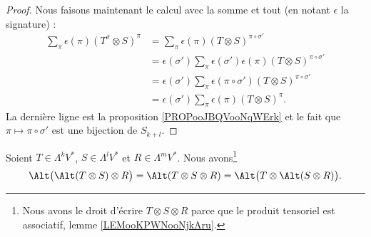 \begin{proof}
	Nous faisons maintenant le calcul avec la somme et tout (en notant \( \epsilon\) la signature) :
	\begin{subequations}
		\begin{align}
			\sum_{\pi}\epsilon(\pi)(T^{\sigma}\otimes S)^{\pi} & =\sum_{\pi}\epsilon(\pi)(T\otimes S)^{\pi\circ \sigma'}                                   \\
			                                                   & =\epsilon(\sigma')\sum_{\pi}\epsilon(\sigma')\epsilon(\pi) (T\otimes S)^{\pi\circ\sigma'} \\
			                                                   & =\epsilon(\sigma')\sum_{\pi}\epsilon(\pi\circ\sigma')(T\otimes S)^{\pi\circ \sigma'}      \\
			                                                   & =\epsilon(\sigma')\sum_{\pi}\epsilon(\pi)(T\otimes S)^{\pi}.
		\end{align}
	\end{subequations}
	La dernière ligne est la proposition \ref{PROPooJBQVooNqWErk} et le fait que \( \pi\mapsto\pi\circ\sigma'\) est une bijection de \( S_{k+l}\).
\end{proof}

\begin{lemma}		\label{LEMooKINCooHUEtaT}
	Soient \( T\in \Lambda^kV^*\), \( S\in \Lambda^lV^*\) et \( R\in \Lambda^mV^*\). Nous avons\footnote{Nous avons le droit d'écrire \( T\otimes S\otimes R\) parce que le produit tensoriel est associatif, lemme \ref{LEMooKPWNooNjkAru}.}
	\begin{equation}
		\Alt\big( \Alt(T\otimes S)\otimes R \big)=\Alt(T\otimes S\otimes R)=\Alt\big( T\otimes \Alt(S\otimes R) \big).
	\end{equation}
\end{lemma}

